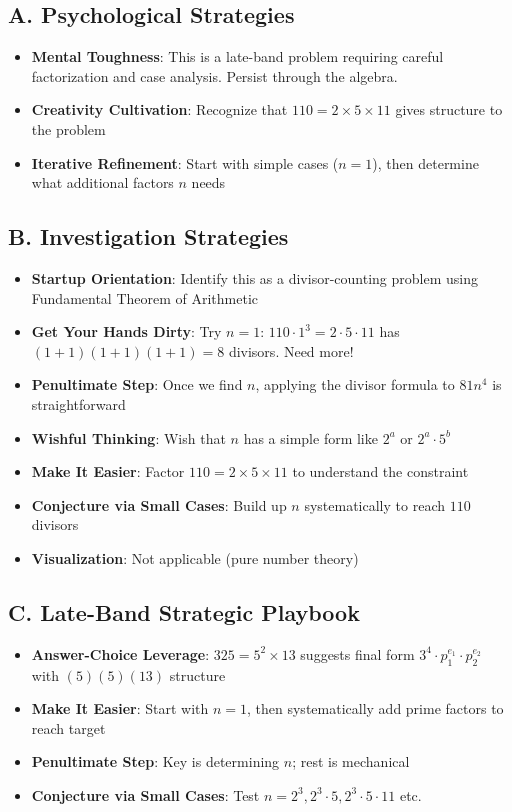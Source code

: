 \documentclass[]{article}
\begin{document}
\begin{strategicbox}
\subsection*{A. Psychological Strategies}
\begin{itemize}[leftmargin=*]
    \item \textbf{Mental Toughness}: This is a late-band problem requiring careful factorization and case analysis. Persist through the algebra.
    \item \textbf{Creativity Cultivation}: Recognize that $110 = 2 \times 5 \times 11$ gives structure to the problem
    \item \textbf{Iterative Refinement}: Start with simple cases ($n=1$), then determine what additional factors $n$ needs
\end{itemize}

\subsection*{B. Investigation Strategies}
\begin{itemize}[leftmargin=*]
    \item \textbf{Startup Orientation}: Identify this as a divisor-counting problem using Fundamental Theorem of Arithmetic
    \item \textbf{Get Your Hands Dirty}: Try $n=1$: $110 \cdot 1^3 = 2 \cdot 5 \cdot 11$ has $(1+1)(1+1)(1+1) = 8$ divisors. Need more!
    \item \textbf{Penultimate Step}: Once we find $n$, applying the divisor formula to $81n^4$ is straightforward
    \item \textbf{Wishful Thinking}: Wish that $n$ has a simple form like $2^a$ or $2^a \cdot 5^b$
    \item \textbf{Make It Easier}: Factor $110 = 2 \times 5 \times 11$ to understand the constraint
    \item \textbf{Conjecture via Small Cases}: Build up $n$ systematically to reach $110$ divisors
    \item \textbf{Visualization}: Not applicable (pure number theory)
\end{itemize}

\subsection*{C. Late-Band Strategic Playbook}
\begin{itemize}[leftmargin=*]
    \item \textbf{Answer-Choice Leverage}: $325 = 5^2 \times 13$ suggests final form $3^4 \cdot p_1^{e_1} \cdot p_2^{e_2}$ with $(5)(5)(13)$ structure
    \item \textbf{Make It Easier}: Start with $n=1$, then systematically add prime factors to reach target
    \item \textbf{Penultimate Step}: Key is determining $n$; rest is mechanical
    \item \textbf{Conjecture via Small Cases}: Test $n = 2^3, 2^3 \cdot 5, 2^3 \cdot 5 \cdot 11$ etc.
\end{itemize}


\end{strategicbox}
\end{document}
